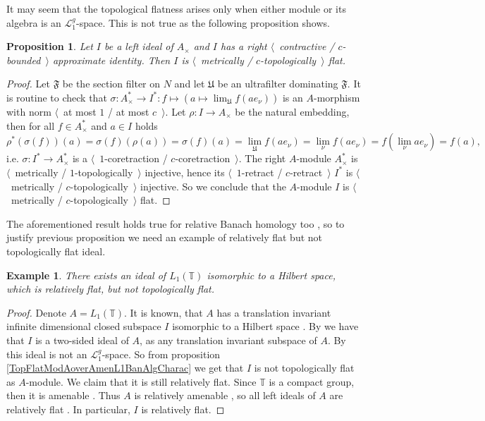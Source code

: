 \documentclass[12pt]{article}
\newtheorem{proposition}[theorem]{Proposition}
\newtheorem{example}[theorem]{Example}
\begin{document}
It may seem that the topological flatness arises only when either module or its algebra is an $\mathcal{L}_1^g$-space. This is not true as the following proposition shows.

\begin{proposition}\label{MetTopFlatIdealsInUnitalAlg} Let $I$ be a left ideal of $A_\times $ and $I$ has a right $\langle$~contractive / $c$-bounded~$\rangle$ approximate identity. Then $I$ is $\langle$~metrically / $c$-topologically~$\rangle$ flat.
\end{proposition}
\begin{proof} Let $\mathfrak{F}$ be the section filter on $N$ and let $\mathfrak{U}$ be an ultrafilter dominating $\mathfrak{F}$. It is routine to check that $\sigma:A_\times ^*\to I^*:f\mapsto (a\mapsto \lim_{\mathfrak{U}}f(ae_\nu))$ is an $A$-morphism with norm $\langle$~at most $1$ / at most $c$~$\rangle$. Let $\rho:I\to A_\times$ be the natural embedding, then for all $f\in A_\times^*$ and $a\in I$ holds
\[
\rho^*(\sigma(f))(a)
=\sigma(f)(\rho(a))
=\sigma(f)(a)
=\lim_{\mathfrak{U}}f(a e_\nu)
=\lim_{\nu}f(a e_\nu)
=f(\lim_{\nu}a e_\nu)
=f(a),
\]
i.e. $\sigma:I^*\to A_\times^*$ is a $\langle$~$1$-coretraction / $c$-coretraction~$\rangle$. The right $A$-module $A_\times ^*$ is $\langle$~metrically / $1$-topologically~$\rangle$ injective, hence its $\langle$~$1$-retract / $c$-retract~$\rangle$ $I^*$ is $\langle$~metrically / $c$-topologically~$\rangle$ injective. So we conclude that the $A$-module $I$ is $\langle$~metrically / $c$-topologically~$\rangle$ flat.
\end{proof}

The aforementioned result holds true for relative Banach homology too \cite[proposition 7.1.45]{HelBanLocConvAlg}, so to justify previous proposition we need an example of relatively flat but not topologically flat ideal.

\begin{example} There exists an ideal of $L_1(\mathbb{T})$ isomorphic to a Hilbert space, which is relatively flat, but not topologically flat.
\end{example}
\begin{proof}
Denote $A=L_1(\mathbb{T})$. It is known, that $A$ has a translation invariant infinite dimensional closed subspace $I$ isomorphic to a Hilbert space \cite[page 52]{RosProjTransInvSbspLpG}. By \cite[proposition 1.4.7]{KaniBanAlg} we have that $I$ is a two-sided ideal of $A$, as any translation invariant subspace of $A$. By \cite[section 23.3]{DefFloTensNorOpId} this ideal is not an $\mathcal{L}_1^g$-space. So from proposition \ref{TopFlatModAoverAmenL1BanAlgCharac} we get that $I$ is not topologically flat as $A$-module. We claim that it is still relatively flat. Since $\mathbb{T}$ is a compact group, then it is amenable \cite[proposition 3.12.1]{PierAmenLCA}. Thus $A$ is relatively amenable \cite[proposition VII.1.86]{HelBanLocConvAlg}, so all left ideals of $A$ are relatively flat \cite[proposition VII.1.60(I)]{HelBanLocConvAlg}. In particular, $I$ is relatively flat.
\end{proof}
\end{document}

